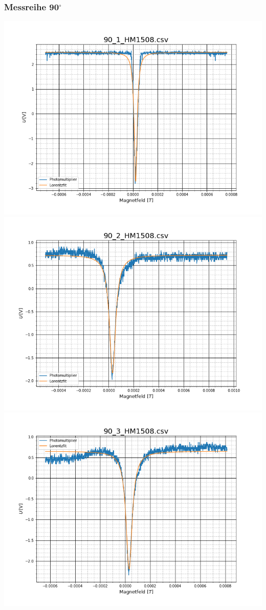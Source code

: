 \subsubsection{Messreihe 90$^\circ$}
\includegraphics[scale=0.3]{Bild/Anhang/Abkuhlung_2/abk_2_901}
\includegraphics[scale=0.3]{Bild/Anhang/Abkuhlung_2/abk_2_902}\\
\includegraphics[scale=0.3]{Bild/Anhang/Abkuhlung_2/abk_2_903}
